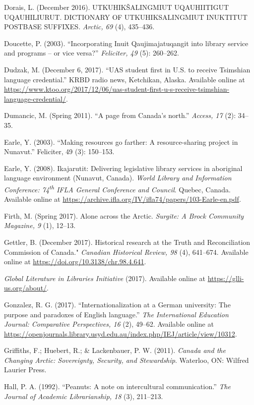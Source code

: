 \documentclass[a4paper,
fontsize=11pt,
oneside,
numbers=noperiodatend,
parskip=half-,
bibliography=totoc,
final
]{scrartcl}
\begin{document}
Dorais, L. (December 2016). UTKUHIKŠALINGMIUT UQAUHIITIGUT UQAUHILIURUT.
DICTIONARY OF UTKUHIKSALINGMIUT INUKTITUT POSTBASE SUFFIXES.
\emph{Arctic, 69} (4), 435--436.

Doucette, P. (2003). \enquote{Incorporating Inuit Qaujimajatuqangit into
library service and programs -- or vice versa?} \emph{Feliciter, 49}
(5): 260--262.

Dudzak, M. (December 6, 2017). \enquote{UAS student first in U.S. to
receive Tsimshian language credential.} KRBD radio news, Ketchikan,
Alaska. Available online at
\url{https://www.ktoo.org/2017/12/06/uas-student-first-u-s-receive-tsimshian-language-credential/}.

Dumancic, M. (Spring 2011). \enquote{A page from Canada's north.}
\emph{Access, 17} (2): 34--35.

Earle, Y. (2003). \enquote{Making resources go farther: A
resource-sharing project in Nunavut.} Feliciter, 49 (3): 150--153.

Earle, Y. (2008). Ikajarutit: Delivering legislative library services in
aboriginal language environment (Nunavut, Canada). \emph{World Library
and Information Conference: 74\textsuperscript{th} IFLA General
Conference and Council}. Quebec, Canada. Available online at
\url{https://archive.ifla.org/IV/ifla74/papers/103-Earle-en.pdf}.

Firth, M. (Spring 2017). Alone across the Arctic. \emph{Surgite: A Brock
Community Magazine, 9} (1), 12--13.

Gettler, B. (December 2017). Historical research at the Truth and
Reconciliation Commission of Canada." \emph{Canadian Historical Review,
98} (4), 641--674. Available online at
\url{https://doi.org/10.3138/chr.98.4.641}.

\emph{Global Literature in Libraries Initiative} (2017). Available
online at \url{https://glli-us.org/about/}.

Gonzalez, R. G. (2017). \enquote{Internationalization at a German
university: The purpose and paradoxes of English language.} \emph{The
International Education Journal: Comparative Perspectives, 16} (2),
49--62. Available online at
\url{https://openjournals.library.usyd.edu.au/index.php/IEJ/article/view/10312}.

Griffiths, F.; Huebert, R.; \& Lackenbauer, P. W. (2011). \emph{Canada
and the Changing Arctic: Sovereignty, Security, and Stewardship}.
Waterloo, ON: Wilfred Laurier Press.

Hall, P. A. (1992). \enquote{Peanuts: A note on intercultural
communication.} \emph{The Journal of Academic Librarianship, 18} (3),
211--213.
\end{document}

